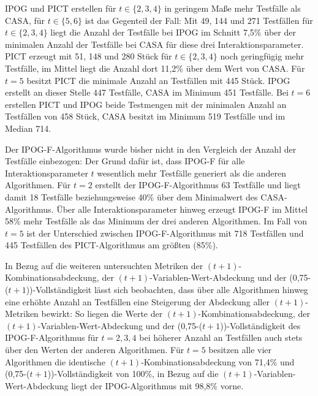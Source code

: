 IPOG und PICT erstellen für $t \in \{2,3,4\}$ in geringem Maße mehr Testfälle als CASA, für $t \in \{5,6\}$ ist das Gegenteil der Fall: Mit 49, 144 und 271 Testfällen für $t \in \{2,3,4\}$ liegt die Anzahl der Testfälle bei IPOG im Schnitt 7,5\% über der minimalen Anzahl der Testfälle bei CASA für diese drei Interaktionsparameter. PICT erzeugt mit 51, 148 und 280 Stück für $t \in \{2,3,4\}$ noch geringfügig mehr Testfälle, im Mittel liegt die Anzahl dort 11,2\% über dem Wert von CASA. Für $t=5$ besitzt PICT die minimale Anzahl an Testfällen mit 445 Stück. IPOG erstellt an dieser Stelle 447 Testfälle, CASA im Minimum 451 Testfälle. Bei $t=6$ erstellen PICT und IPOG beide Testmengen mit der minimalen Anzahl an Testfällen von 458 Stück, CASA besitzt im Minimum 519 Testfälle und im Median 714.

Der IPOG-F-Algorithmus wurde bisher nicht in den Vergleich der Anzahl der Testfälle einbezogen: Der Grund dafür ist, dass IPOG-F für alle Interaktionsparameter $t$ wesentlich mehr Testfälle generiert als die anderen Algorithmen. Für $t=2$ erstellt der IPOG-F-Algorithmus 63 Testfälle und liegt damit 18 Testfälle beziehungsweise 40\% über dem Minimalwert des CASA-Algorithmus. Über alle Interaktionsparameter hinweg erzeugt IPOG-F im Mittel 58\% mehr Testfälle als das Minimum der drei anderen Algorithmen. Im Fall von $t=5$ ist der Unterschied zwischen IPOG-F-Algorithmus mit 718 Testfällen und 445 Testfällen des PICT-Algorithmus am größten (85\%).

In Bezug auf die weiteren untersuchten Metriken der $(t+1)$-Kombinationsabdeckung, der $(t+1)$-Variablen-Wert-Abdeckung und der (0,75-($t+1$))-Vollständigkeit lässt sich beobachten, dass über alle Algorithmen hinweg eine erhöhte Anzahl an Testfällen eine Steigerung der Abdeckung aller $(t+1)$-Metriken bewirkt: So liegen die Werte der $(t+1)$-Kombinationsabdeckung, der $(t+1)$-Variablen-Wert-Abdeckung und der (0,75-($t+1$))-Vollständigkeit des IPOG-F-Algorithmus für $t=2,3,4$ bei höherer Anzahl an Testfällen auch stets über den Werten der anderen Algorithmen. Für $t=5$ besitzen alle vier Algorithmen die identische $(t+1)$-Kombinationsabdeckung von 71,4\% und (0,75-($t+1$))-Vollständigkeit von 100\%, in Bezug auf die $(t+1)$-Variablen-Wert-Abdeckung liegt der IPOG-Algorithmus mit 98,8\% vorne.









